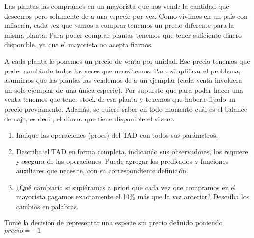 Las plantas las compramos en un mayorista que nos vende la cantidad que deseemos pero solamente de a una especie por vez. Como vivimos en un país con inflación, cada vez que vamos a comprar tenemos un precio diferente para la misma planta. Para poder comprar plantas tenemos que tener suficiente dinero disponible, ya que el mayorista no acepta fiarnos.

A cada planta le ponemos un precio de venta por unidad. Ese precio tenemos que poder cambiarlo todas las veces que necesitemos. Para simplificar el problema, asumimos que las plantas las vendemos de a un ejemplar (cada venta involucra un solo ejemplar de una única especie). Por supuesto que para poder hacer una venta tenemos que tener stock de esa planta y tenemos que haberle fijado un precio previamente. Además, se quiere saber en todo momento cuál es el balance de caja,
es decir, el dinero que tiene disponible el vivero.

\begin{enumerate}[label=\alph*)]
	\item Indique las operaciones (procs) del TAD con todos sus parámetros.
	\item Describa el TAD en forma completa, indicando sus observadores, los requiere y asegura de las operaciones. Puede agregar los predicados y funciones auxiliares que necesite, con su correspondiente definición.
	\item ¿Qué cambiaría si supiéramos a priori que cada vez que compramos en el mayorista pagamos exactamente el 10\% más que la vez anterior? Describa los cambios en palabras.
\end{enumerate}

Tomé la decisión de representar una especie sin precio definido poniendo $precio = -1$

